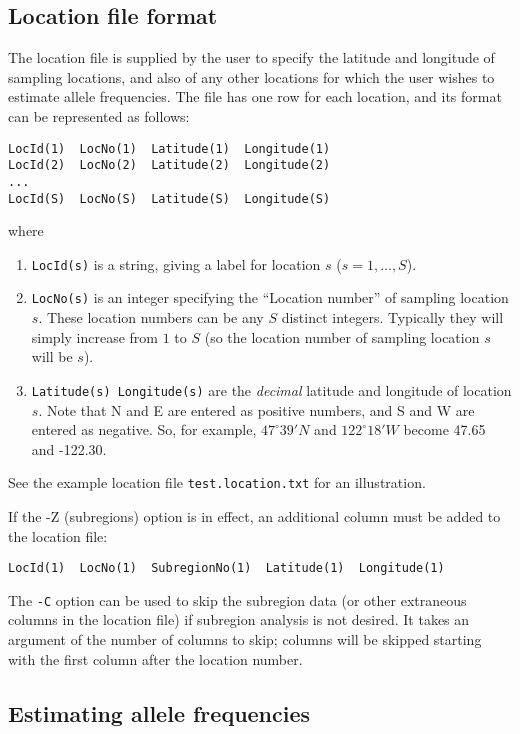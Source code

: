 \documentclass[10pt,titlepage,times,letterpaper]{article}
\begin{document}
\subsection{Location file format}

The location file is supplied by the user to specify the latitude and
longitude of sampling locations, and also of any other locations
for which the user wishes to estimate allele frequencies.
The file has one row for each location, and its format 
can be represented as follows:
\begin{verbatim}
LocId(1)  LocNo(1)  Latitude(1)  Longitude(1)
LocId(2)  LocNo(2)  Latitude(2)  Longitude(2)
...
LocId(S)  LocNo(S)  Latitude(S)  Longitude(S)
\end{verbatim}
where
\begin{enumerate}
\item{\tt LocId(s)} is a string, giving a label for location $s$
($s = 1,\dots,S$).
\item{\tt LocNo(s)} is an integer specifying the ``Location
number'' of sampling location $s$. These location numbers can be
any $S$ distinct integers. Typically they will simply increase from $1$ to $S$
(so the location number of sampling location $s$ will be $s$). 
\item{{\tt Latitude(s) Longitude(s)}} are the {\it decimal} latitude
and longitude of location $s$. Note that N and E are entered as
positive numbers, and S and W are entered as negative. So, for
example, $47^\circ 39' N$ and $122^\circ 18' W$ become 47.65 and -122.30.
\end{enumerate}
See the example location file {\tt test.location.txt} for an illustration.

If the -Z (subregions) option is in effect, an additional column must be added to
the location file:

\begin{small}
\begin{verbatim}
LocId(1)  LocNo(1)  SubregionNo(1)  Latitude(1)  Longitude(1)
\end{verbatim}
\end{small}

The {\tt -C} option can be used to skip the subregion data (or other 
extraneous columns in the location file) if subregion analysis is not
desired.  It takes an argument of the number of columns to skip;
columns will be skipped starting with the first column after the location
number.

\subsection{Estimating allele frequencies}
\end{document}
